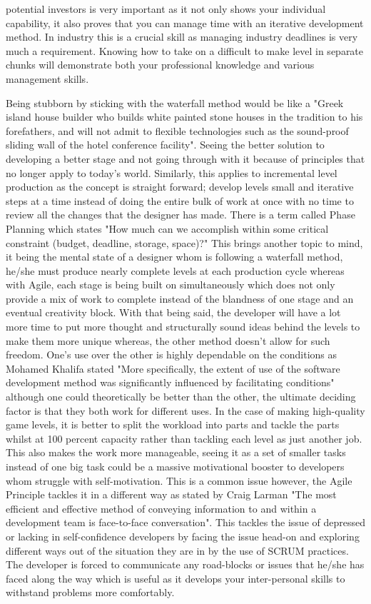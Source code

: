 \documentclass{scrartcl}
\begin{document}
potential investors is very important as it not only shows your individual capability, it also proves that you can manage time with an iterative development method. In industry this is a crucial skill as managing industry deadlines is very much a requirement. Knowing how to take on a difficult to make level in separate chunks will demonstrate both your professional knowledge and various management skills.

Being stubborn by sticking with the waterfall method would be like a \cite{6} "Greek island house builder who builds white painted stone houses in the tradition to his forefathers, and will not admit to flexible technologies such as the sound-proof sliding wall of the hotel conference facility". Seeing the better solution to developing a better stage and not going through with it because of principles that no longer apply to today's world. Similarly, this applies to incremental level production as the concept is straight forward; develop levels small and iterative steps at a time instead of doing the entire bulk of work at once with no time to review all the changes that the designer has made. There is a term called Phase Planning which states \cite{6} "How much can we accomplish within some critical constraint (budget, deadline, storage, space)?" This brings another topic to mind, it being the mental state of a designer whom is following a waterfall method, he/she must produce nearly complete levels at each production cycle whereas with Agile, each stage is being built on simultaneously which does not only provide a mix of work to complete instead of the blandness of one stage and an eventual creativity block. With that being said, the developer will have a lot more time to put more thought and structurally sound ideas behind the levels to make them more unique whereas, the other method doesn't allow for such freedom. One's use over the other is highly dependable on the conditions as \cite{7} Mohamed Khalifa stated "More specifically, the extent of use of the software development method was significantly influenced by facilitating conditions" although one could theoretically be better than the other, the ultimate deciding factor is that they both work for different uses. In the case of making high-quality game levels, it is better to split the workload into parts and tackle the parts whilst at 100 percent capacity rather than tackling each level as just another job. This also makes the work more manageable, seeing it as a set of smaller tasks instead of one big task could be a massive motivational booster to developers whom struggle with self-motivation. This is a common issue however, the Agile Principle tackles it in a different way as stated by \cite{8}Craig Larman "The most efficient and effective method of conveying information to and within a development team is face-to-face conversation". This tackles the issue of depressed or lacking in self-confidence developers by facing the issue head-on and exploring different ways out of the situation they are in by the use of SCRUM practices. The developer is forced to communicate any road-blocks or issues that he/she has faced along the way which is useful as it develops your inter-personal skills to withstand problems more comfortably.
 
\end{document}
